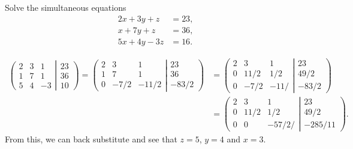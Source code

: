 \documentclass[10pt,notitlepage]{revtex4-1}
\newenvironment{example}[1][Example]{\begin{trivlist}
\item[\hskip \labelsep {\bfseries #1}]}{\end{trivlist}}
\begin{document}
\begin{example}
	Solve the simultaneous equations
	\begin{equation}\begin{aligned}
		2x + 3y + z &= 23,\\
		x + 7y + z &= 36,\\
		5x + 4y - 3z &= 16.
	\end{aligned}\end{equation}
	
	\begin{equation}\begin{aligned}
		\left(\begin{matrix}2&3&1\\ 1&7&1\\ 5&4&-3\end{matrix}\right|
		\left.\begin{matrix}23\\ 36\\ 10\end{matrix}\right)=
		\left(\begin{matrix}2&3&1\\ 1&7&1\\ 0&-7/2&-11/2\end{matrix}\right|
		\left.\begin{matrix}23\\ 36\\ -83/2\end{matrix}\right)&=
		\left(\begin{matrix}2&3&1\\ 0&11/2&1/2\\ 0&-7/2&-11/\end{matrix}\right|
		\left.\begin{matrix}23\\ 49/2\\ -83/2\end{matrix}\right)\\
		&=\left(\begin{matrix}2&3&1\\ 0&11/2&1/2\\ 0&0&-57/2/\end{matrix}\right|
		\left.\begin{matrix}23\\ 49/2\\ -285/11\end{matrix}\right).
	\end{aligned}\end{equation}
	From this, we can back substitute and see that $z=5$, $y=4$ and $x=3$.
\end{example}
\end{document}
